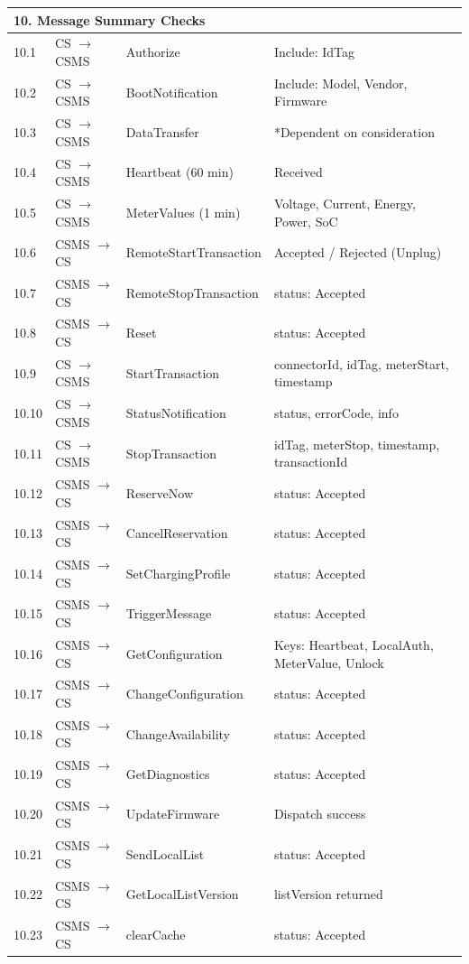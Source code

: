 \documentclass[a4paper,11pt]{report}
\begin{document}
\begin{footnotesize}
\begin{longtable}{|p{1.2cm}|p{2.5cm}|p{5.5cm}|p{6cm}|}
\multicolumn{4}{|l|}{\textbf{10. Message Summary Checks}} \\
\hline
10.1 & CS $\to$ CSMS & Authorize & Include: IdTag \\
\hline
10.2 & CS $\to$ CSMS & BootNotification & Include: Model, Vendor, Firmware \\
\hline
10.3 & CS $\to$ CSMS & DataTransfer & *Dependent on consideration \\
\hline
10.4 & CS $\to$ CSMS & Heartbeat (60 min) & Received \\
\hline
10.5 & CS $\to$ CSMS & MeterValues (1 min) & Voltage, Current, Energy, Power, SoC \\
\hline
10.6 & CSMS $\to$ CS & RemoteStartTransaction & Accepted / Rejected (Unplug) \\
\hline
10.7 & CSMS $\to$ CS & RemoteStopTransaction & status: Accepted \\
\hline
10.8 & CSMS $\to$ CS & Reset & status: Accepted \\
\hline
10.9 & CS $\to$ CSMS & StartTransaction & connectorId, idTag, meterStart, timestamp \\
\hline
10.10 & CS $\to$ CSMS & StatusNotification & status, errorCode, info \\
\hline
10.11 & CS $\to$ CSMS & StopTransaction & idTag, meterStop, timestamp, transactionId \\
\hline
10.12 & CSMS $\to$ CS & ReserveNow & status: Accepted \\
\hline
10.13 & CSMS $\to$ CS & CancelReservation & status: Accepted \\
\hline
10.14 & CSMS $\to$ CS & SetChargingProfile & status: Accepted \\
\hline
10.15 & CSMS $\to$ CS & TriggerMessage & status: Accepted \\
\hline
10.16 & CSMS $\to$ CS & GetConfiguration & Keys: Heartbeat, LocalAuth, MeterValue, Unlock \\
\hline
10.17 & CSMS $\to$ CS & ChangeConfiguration & status: Accepted \\
\hline
10.18 & CSMS $\to$ CS & ChangeAvailability & status: Accepted \\
\hline
10.19 & CSMS $\to$ CS & GetDiagnostics & status: Accepted \\
\hline
10.20 & CSMS $\to$ CS & UpdateFirmware & Dispatch success \\
\hline
10.21 & CSMS $\to$ CS & SendLocalList & status: Accepted \\
\hline
10.22 & CSMS $\to$ CS & GetLocalListVersion & listVersion returned \\
\hline
10.23 & CSMS $\to$ CS & clearCache & status: Accepted \\
\hline
 

\end{longtable}
\end{footnotesize}
\end{document}
